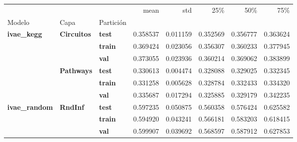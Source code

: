\begin{tabular}{lllrrrrr}
\toprule
 &  &  & mean & std & 25\% & 50\% & 75\% \\
Modelo & Capa & Partición &  &  &  &  &  \\
\midrule
\multirow[t]{6}{*}{\textbf{ivae\_kegg}} & \multirow[t]{3}{*}{\textbf{Circuitos}} & \textbf{test} & 0.358537 & 0.011159 & 0.352569 & 0.356777 & 0.363624 \\
\textbf{} & \textbf{} & \textbf{train} & 0.369424 & 0.023056 & 0.356307 & 0.360233 & 0.377945 \\
\textbf{} & \textbf{} & \textbf{val} & 0.373055 & 0.023936 & 0.360214 & 0.369062 & 0.383899 \\
\cline{2-8}
\textbf{} & \multirow[t]{3}{*}{\textbf{Pathways}} & \textbf{test} & 0.330613 & 0.004474 & 0.328088 & 0.329025 & 0.332345 \\
\textbf{} & \textbf{} & \textbf{train} & 0.331258 & 0.005628 & 0.328784 & 0.332433 & 0.334320 \\
\textbf{} & \textbf{} & \textbf{val} & 0.335687 & 0.017294 & 0.325885 & 0.329179 & 0.342235 \\
\cline{1-8} \cline{2-8}
\multirow[t]{3}{*}{\textbf{ivae\_random}} & \multirow[t]{3}{*}{\textbf{RndInf}} & \textbf{test} & 0.597235 & 0.050875 & 0.560358 & 0.576424 & 0.625582 \\
\textbf{} & \textbf{} & \textbf{train} & 0.594920 & 0.043241 & 0.566181 & 0.583203 & 0.618415 \\
\textbf{} & \textbf{} & \textbf{val} & 0.599907 & 0.039692 & 0.568597 & 0.587912 & 0.627853 \\
\cline{1-8} \cline{2-8}
\bottomrule
\end{tabular}
